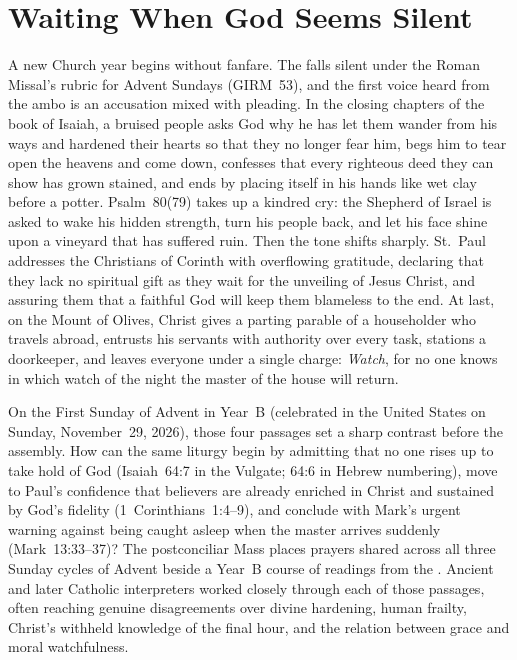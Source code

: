\section{Waiting When God Seems Silent}

A new Church year begins without fanfare. The  falls silent under the Roman Missal's rubric for Advent Sundays (GIRM~53), and the first voice heard from the ambo is an accusation mixed with pleading. In the closing chapters of the book of Isaiah, a bruised people asks God why he has let them wander from his ways and hardened their hearts so that they no longer fear him, begs him to tear open the heavens and come down, confesses that every righteous deed they can show has grown stained, and ends by placing itself in his hands like wet clay before a potter. Psalm~80(79) takes up a kindred cry: the Shepherd of Israel is asked to wake his hidden strength, turn his people back, and let his face shine upon a vineyard that has suffered ruin. Then the tone shifts sharply. St.~Paul addresses the Christians of Corinth with overflowing gratitude, declaring that they lack no spiritual gift as they wait for the unveiling of Jesus Christ, and assuring them that a faithful God will keep them blameless to the end. At last, on the Mount of Olives, Christ gives a parting parable of a householder who travels abroad, entrusts his servants with authority over every task, stations a doorkeeper, and leaves everyone under a single charge: \emph{Watch}, for no one knows in which watch of the night the master of the house will return.

On the First Sunday of Advent in Year~B (celebrated in the United States on Sunday, November~29, 2026), those four passages set a sharp contrast before the assembly. How can the same liturgy begin by admitting that no one rises up to take hold of God (Isaiah~64:7 in the Vulgate; 64:6 in Hebrew numbering), move to Paul's confidence that believers are already enriched in Christ and sustained by God's fidelity (1~Corinthians~1:4--9), and conclude with Mark's urgent warning against being caught asleep when the master arrives suddenly (Mark~13:33--37)? The postconciliar Mass places prayers shared across all three Sunday cycles of Advent beside a Year~B course of readings from the . Ancient and later Catholic interpreters worked closely through each of those passages, often reaching genuine disagreements over divine hardening, human frailty, Christ's withheld knowledge of the final hour, and the relation between grace and moral watchfulness.

